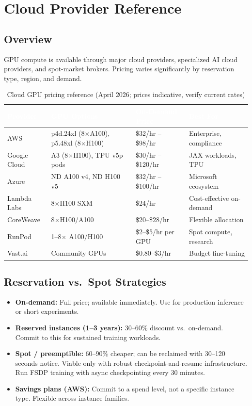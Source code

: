 \chapter{Cloud Provider Reference}

\section{Overview}

GPU compute is available through major cloud providers, specialized AI cloud providers, and spot-market brokers. Pricing varies significantly by reservation type, region, and demand.

\begin{table}[H]
\centering\small\sffamily
{}
\begin{tabular}{L{2.2cm}L{3.2cm}L{2.8cm}L{3.5cm}}
\toprule
{}\textcolor{white}{\textbf{Provider}} & \textcolor{white}{\textbf{GPU Options}} & \textcolor{white}{\textbf{On-Demand Price}} & \textcolor{white}{\textbf{Best For}} \\
\midrule
AWS & p4d.24xl (8$\times$A100), p5.48xl (8$\times$H100) & \$32/hr -- \$98/hr & Enterprise, compliance \\
Google Cloud & A3 (8$\times$H100), TPU v5p pods & \$30/hr -- \$120/hr & JAX workloads, TPU \\
Azure & ND A100 v4, ND H100 v5 & \$32/hr -- \$100/hr & Microsoft ecosystem \\
Lambda Labs & 8$\times$H100 SXM & \$24/hr & Cost-effective on-demand \\
CoreWeave & 8$\times$H100/A100 & \$20--\$28/hr & Flexible allocation \\
RunPod & 1--8$\times$ A100/H100 & \$2--\$5/hr per GPU & Spot compute, research \\
Vast.ai & Community GPUs & \$0.80--\$3/hr & Budget fine-tuning \\
\bottomrule
\end{tabular}
\caption{Cloud GPU pricing reference (April 2026; prices indicative, verify current rates)}
\end{table}

\section{Reservation vs.\ Spot Strategies}

\begin{itemize}
  \item \textbf{On-demand:} Full price; available immediately. Use for production inference or short experiments.
  \item \textbf{Reserved instances (1--3 years):} 30--60\% discount vs.\ on-demand. Commit to this for sustained training workloads.
  \item \textbf{Spot / preemptible:} 60--90\% cheaper; can be reclaimed with 30--120 seconds notice. Viable only with robust checkpoint-and-resume infrastructure. Run FSDP training with async checkpointing every 30 minutes.
  \item \textbf{Savings plans (AWS):} Commit to a spend level, not a specific instance type. Flexible across instance families.
\end{itemize}

